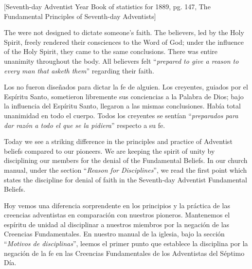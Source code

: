 [Seventh-day Adventist Year Book of statistics for 1889, pg. 147, The Fundamental Principles of Seventh-day Adventists]


The  were not designed to dictate someone’s faith. The believers, led by the Holy Spirit, freely rendered their consciences to the Word of God; under the influence of the Holy Spirit, they came to the same conclusions. There was entire unanimity throughout the body. All believers felt “\textit{prepared to give a reason to every man that asketh them}” regarding their faith.


Los  no fueron diseñados para dictar la fe de alguien. Los creyentes, guiados por el Espíritu Santo, sometieron libremente sus conciencias a la Palabra de Dios; bajo la influencia del Espíritu Santo, llegaron a las mismas conclusiones. Había total unanimidad en todo el cuerpo. Todos los creyentes se sentían “\textit{preparados para dar razón a todo el que se la pidiera}” respecto a su fe.


Today we see a striking difference in the principles and practice of Adventist beliefs compared to our pioneers. We are keeping the spirit of unity by disciplining our members for the denial of the Fundamental Beliefs. In our church manual, under the section “\textit{Reason for Disciplines}”, we read the first point which states the discipline for denial of faith in the Seventh-day Adventist Fundamental Beliefs.


Hoy vemos una diferencia sorprendente en los principios y la práctica de las creencias adventistas en comparación con nuestros pioneros. Mantenemos el espíritu de unidad al disciplinar a nuestros miembros por la negación de las Creencias Fundamentales. En nuestro manual de la iglesia, bajo la sección “\textit{Motivos de disciplinas}”, leemos el primer punto que establece la disciplina por la negación de la fe en las Creencias Fundamentales de los Adventistas del Séptimo Día.





